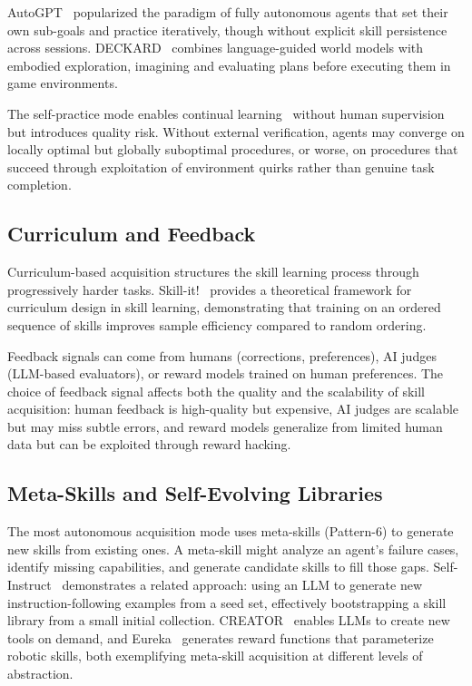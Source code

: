 \documentclass[conference, compsoc]{IEEEtran}
\theoremstyle{plain}
\begin{document}
AutoGPT~\cite{autogpt2023} popularized the paradigm of fully autonomous agents that set their own sub-goals and practice iteratively, though without explicit skill persistence across sessions. DECKARD~\cite{nottingham2023deckard} combines language-guided world models with embodied exploration, imagining and evaluating plans before executing them in game environments.

The self-practice mode enables continual learning~\cite{wang2024comprehensive} without human supervision but introduces quality risk. Without external verification, agents may converge on locally optimal but globally suboptimal procedures, or worse, on procedures that succeed through exploitation of environment quirks rather than genuine task completion.

\subsection{Curriculum and Feedback}
\label{sec:acquisition:curriculum}

Curriculum-based acquisition structures the skill learning process through progressively harder tasks. Skill-it!~\cite{chen2023skillit} provides a theoretical framework for curriculum design in skill learning, demonstrating that training on an ordered sequence of skills improves sample efficiency compared to random ordering.

Feedback signals can come from humans (corrections, preferences), AI judges (LLM-based evaluators), or reward models trained on human preferences. The choice of feedback signal affects both the quality and the scalability of skill acquisition: human feedback is high-quality but expensive, AI judges are scalable but may miss subtle errors, and reward models generalize from limited human data but can be exploited through reward hacking.

\subsection{Meta-Skills and Self-Evolving Libraries}
\label{sec:acquisition:meta}

The most autonomous acquisition mode uses meta-skills (Pattern-6) to generate new skills from existing ones. A meta-skill might analyze an agent's failure cases, identify missing capabilities, and generate candidate skills to fill those gaps. Self-Instruct~\cite{wang2023selfinstruct} demonstrates a related approach: using an LLM to generate new instruction-following examples from a seed set, effectively bootstrapping a skill library from a small initial collection. CREATOR~\cite{qian2023creator} enables LLMs to create new tools on demand, and Eureka~\cite{ma2024eureka} generates reward functions that parameterize robotic skills, both exemplifying meta-skill acquisition at different levels of abstraction.
\end{document}
